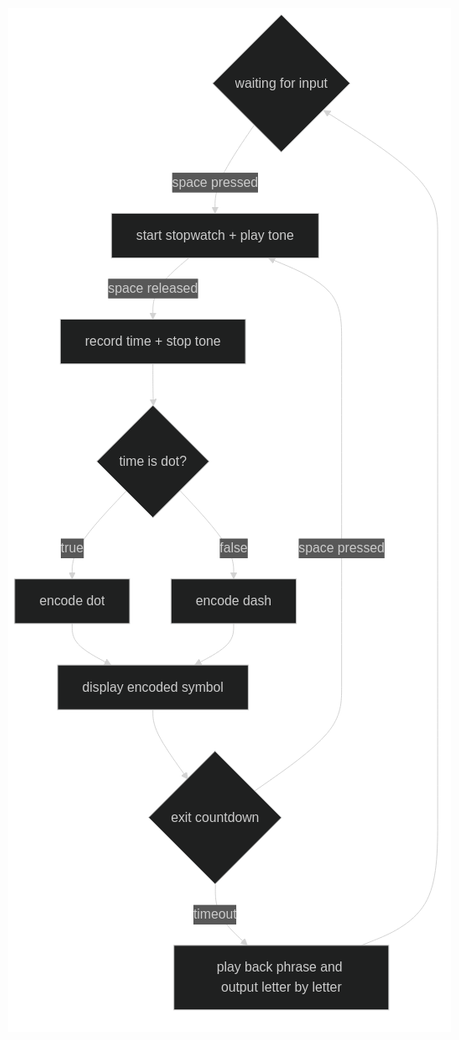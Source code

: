 \documentclass[12pt]{article}
\begin{document}
\begin{center}
    \includegraphics[scale=0.5]{o-2.png}
\end{center}
\end{document}
